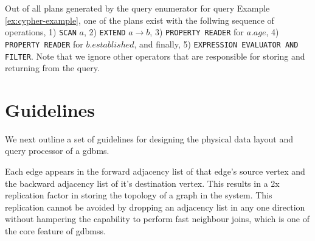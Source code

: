 Out of all plans generated by the query enumerator for query Example \ref{ex:cypher-example}, one of the plans exist with the follwing sequence of operations, 1) \texttt{SCAN} $a$, 2) \texttt{EXTEND} $a{\rightarrow}b$, 3) \texttt{PROPERTY READER} for $a.age$, 4) \texttt{PROPERTY READER} for $b.established$, and finally, 5) \texttt{EXPRESSION EVALUATOR AND FILTER}. Note that we ignore other operators that are responsible for storing and returning from the query.

\section{Guidelines}
\label{sec:guidelines}

We next outline a set of guidelines for designing the physical data layout and query processor of a \gls{gdbms}.

\begin{guideline}
Each edge appears in the forward adjacency list of that edge's source vertex and the backward adjacency list of it's destination vertex. This results in a 2x replication factor in storing the topology of a graph in the system. This  replication cannot be avoided by dropping an adjacency list in any one direction without hampering the capability to perform fast neighbour joins, which is one of the core feature of \gls{gdbms}s.
\end{guideline}

